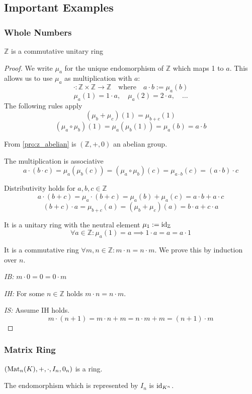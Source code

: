 \subsection{Important Examples}
\subsubsection{Whole Numbers}
\begin{proposition}\label{pro:ring_Z}
   \(\mathbb{Z}\) is a commutative unitary ring
\end{proposition}
\begin{proof}
   We write \(\mu_a\) for the unique endomorphism of \(\mathbb{Z}\) which maps 1 to \(a\).
   This allows us to use \(\mu_a\) as multiplication with \(a\):
   \[\cdot: \mathbb{Z} \times \mathbb{Z} \to \mathbb{Z} \quad\text{where}\quad a \cdot b := \mu_a(b)\]
   \[\mu_a(1) = 1 \cdot a, \quad \mu_a(2) = 2 \cdot a, \quad\ldots\]
   The following rules apply
   \[(\mu_b + \mu_c)(1) = \mu_{b + c}(1)\]
   \[(\mu_a \circ \mu_b)(1) = \mu_a(\mu_b(1)) = \mu_a(b) = a \cdot b\]

   From \cref{pro:z_abelian} is \((\mathbb{Z}, +, 0)\) an abelian group.

   The multiplication is associative
   \[a \cdot (b \cdot c) = \mu_a(\mu_b(c)) = (\mu_a \circ \mu_b)(c) = \mu_{a \cdot b}(c) = (a \cdot b) \cdot c\]

   Distributivity holds for \(a, b, c \in \mathbb{Z}\)
   \[a \cdot (b + c) = \mu_a \cdot (b + c) = \mu_a(b) + \mu_a(c) = a \cdot b + a \cdot c\]
   \[(b + c) \cdot a = \mu_{b + c}(a) = (\mu_b + \mu_c)(a) = b \cdot a + c \cdot a\]

   It is a unitary ring with the neutral element \(\mu_1 := \operatorname{id}_{\mathbb{Z}}\)
   \[\forall a \in \mathbb{Z}: \mu_a(1) = a \implies 1 \cdot a = a = a \cdot 1\]

   It is a commutative ring \(\forall m, n \in \mathbb{Z}: m \cdot n = n \cdot m\).
   We prove this by induction over \(n\).

   \textit{IB:} \(m \cdot 0 = 0 = 0 \cdot m\)

   \textit{IH:} For some \(n \in \mathbb{Z}\) holds \(m \cdot n = n \cdot m\).

   \textit{IS:} Assume IH holds.
   \[m \cdot (n + 1) = m \cdot n + m = n \cdot m + m = (n + 1) \cdot m\]
\end{proof}

\subsubsection{Matrix Ring}
\begin{proposition}
   \((\operatorname{Mat}_n(K), +, \cdot, I_n, 0_n)\) is a ring.
\end{proposition}
\begin{remark}
   The endomorphism which is represented by \(I_n\) is \(\operatorname{id}_{K^n}\).
\end{remark}

